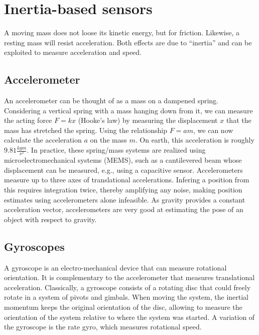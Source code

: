 \section{Inertia-based sensors}
A moving mass does not loose its kinetic energy, but for friction. Likewise, a resting mass will resist acceleration. Both effects are due to ``inertia''  and can be exploited to measure acceleration and speed.

\subsection{Accelerometer}
An accelerometer can be thought of as a mass on a dampened spring. Considering a vertical spring with a mass hanging down from it, we can measure the acting force $F=kx$ (Hooke's law) by measuring the displacement $x$ that the mass has stretched the spring. Using the relationship $F=am$, we can now calculate the acceleration $a$ on the mass $m$. On earth, this acceleration is roughly $9.81\frac{kg m}{s^2}$. In practice, these spring/mass systems are realized using microelectromechanical systems (MEMS), such as a cantilevered beam whose displacement can be measured, e.g., using a capacitive sensor. Accelerometers measure up to three axes of translational accelerations. Infering a position from this requires integration twice, thereby amplifying any noise, making position estimates using accelerometers alone infeasible. As gravity provides a constant acceleration vector, accelerometers are very good at estimating the pose of an object with respect to gravity.

\subsection{Gyroscopes}
A gyroscope is an electro-mechanical device that can measure rotational orientation. It is complementary to the accelerometer that measures translational acceleration. Classically, a gyroscope consists of a rotating disc that could freely rotate in a system of pivots and gimbals. When moving the system, the inertial momentum keeps the original orientation of the disc, allowing to measure the orientation of the system relative to where the system was started. A variation of the gyroscope is the rate gyro, which measures rotational speed.

